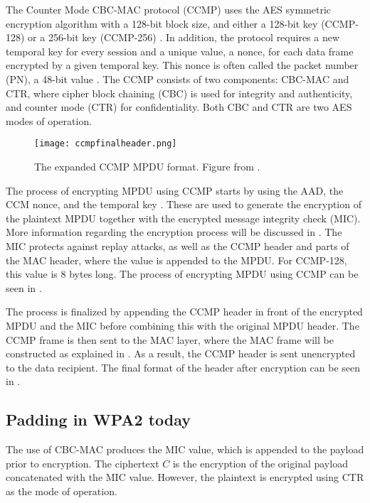 The Counter Mode CBC-MAC protocol (CCMP) uses the AES symmetric encryption algorithm with a 128-bit block size, and either a 128-bit key (CCMP-128) or a 256-bit key (CCMP-256) \cite{9363693}. In addition, the protocol requires a new temporal key for every session and a unique value, a nonce, for each data frame encrypted by a given temporal key. This nonce is often called the packet number (PN), a 48-bit value \cite{junaid2006vulnerabilities}. The CCMP consists of two components: CBC-MAC and CTR, where cipher block chaining (CBC) is used for integrity and authenticity, and counter mode (CTR) for confidentiality. Both CBC and CTR are two AES modes of operation.

\begin{figure}
\texttt{[image: ccmpfinalheader.png]}
\caption{The expanded CCMP MPDU format. Figure from \cite{9363693}.}
\label{fig:ccmpfinalheader}
\end{figure}

The process of encrypting MPDU using CCMP starts by using the AAD, the CCM nonce, and the temporal key \cite{9363693,junaid2006vulnerabilities,ross2010securing,10.3844/jcssp.2015.283.290}.
These are used to generate the encryption of the plaintext MPDU together with the encrypted message integrity check (MIC). More information regarding the encryption process will be discussed in . The MIC protects against replay attacks, as well as the CCMP header and parts of the MAC header, where the value is appended to the MPDU. For CCMP-128, this value is 8 bytes long. The process of encrypting MPDU using CCMP can be seen in . 

The process is finalized by appending the CCMP header in front of the encrypted MPDU and the MIC before combining this with the original MPDU header. The CCMP frame is then sent to the MAC layer, where the MAC frame will be constructed as explained in . As a result, the CCMP header is sent unencrypted to the data recipient. The final format of the header after encryption can be seen in .

\subsection{Padding in WPA2 today\label{subsec:paddingwpa-back}}

The use of CBC-MAC produces the MIC value, which is appended to the payload prior to encryption. The ciphertext $C$ is the encryption of the original payload concatenated with the MIC value. However, the plaintext is encrypted using CTR as the mode of operation.

